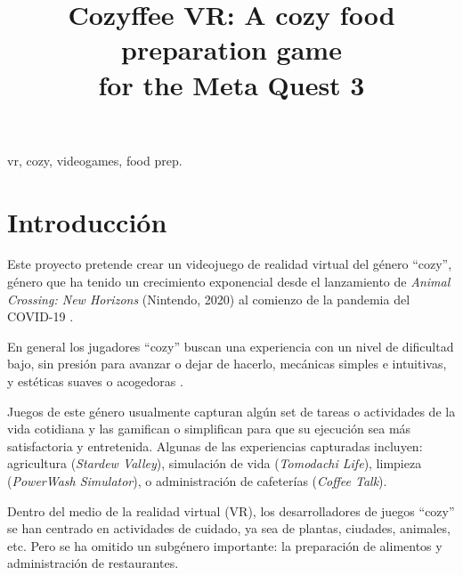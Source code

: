 \documentclass[conference]{IEEEtran}
\begin{document}
\title{Cozyffee VR: A cozy food preparation game\\
for the Meta Quest 3
}

\author{
\and
{}
}

\maketitle

\begin{IEEEkeywords}
vr, cozy, videogames, food prep.
\end{IEEEkeywords}

\section{Introducción}
Este proyecto pretende crear un videojuego de realidad virtual del género “cozy”, género que ha tenido un crecimiento exponencial desde el lanzamiento de \textit{Animal Crossing: New Horizons} (Nintendo, 2020) al comienzo de la pandemia del COVID-19 \cite{Cozycare2024}.\medskip

En general los jugadores “cozy” buscan una experiencia con un nivel de dificultad bajo, sin presión para avanzar o dejar de hacerlo, mecánicas simples e intuitivas, y estéticas suaves o acogedoras \cite{WhoseVibe}.\medskip

Juegos de este género usualmente capturan algún set de tareas o actividades de la vida cotidiana y las gamifican o simplifican para que su ejecución sea más satisfactoria y entretenida. Algunas de las experiencias capturadas incluyen: agricultura (\textit{Stardew Valley}), simulación de vida (\textit{Tomodachi Life}), limpieza (\textit{PowerWash Simulator}), o administración de cafeterías (\textit{Coffee Talk}).\medskip

Dentro del medio de la realidad virtual (VR), los desarrolladores de juegos “cozy” se han centrado en actividades de cuidado, ya sea de plantas, ciudades, animales, etc. Pero se ha omitido un subgénero importante: la preparación de alimentos y administración de restaurantes.\medskip
\end{document}
